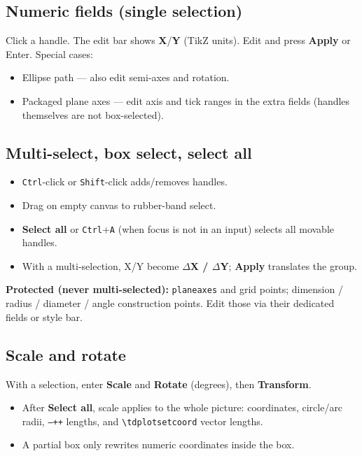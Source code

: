 \documentclass[a4paper]{ltxdoc}
\newcommand{\ui}[1]{\textbf{#1}}
\newcommand{\key}[1]{\texttt{#1}}
\begin{document}
\subsection{Numeric fields (single selection)}
Click a handle.  The edit bar shows \ui{X}/\ui{Y} (TikZ units).  Edit and
press \ui{Apply} or Enter.  Special cases:
\begin{itemize}[nosep]
  \item Ellipse path --- also edit semi-axes and rotation.
  \item Packaged plane axes --- edit axis and tick ranges in the extra
        fields (handles themselves are not box-selected).
\end{itemize}

\subsection{Multi-select, box select, select all}
\begin{itemize}[nosep]
  \item \key{Ctrl}-click or \key{Shift}-click adds/removes handles.
  \item Drag on empty canvas to rubber-band select.
  \item \ui{Select all} or \key{Ctrl}+\key{A} (when focus is not in an
        input) selects all movable handles.
  \item With a multi-selection, X/Y become \textbf{$\Delta$X / $\Delta$Y};
        \ui{Apply} translates the group.
\end{itemize}

\noindent\textbf{Protected (never multi-selected):}
\texttt{planeaxes} and grid points; dimension / radius / diameter /
angle construction points.  Edit those via their dedicated fields or
style bar.

\subsection{Scale and rotate}
With a selection, enter \ui{Scale} and \ui{Rotate} (degrees), then
\ui{Transform}.
\begin{itemize}[nosep]
  \item After \ui{Select all}, scale applies to the whole picture:
        coordinates, circle/arc radii, \texttt{--++} lengths, and
        \texttt{\textbackslash tdplotsetcoord} vector lengths.
  \item A partial box only rewrites numeric coordinates inside the box.
\end{itemize}
\end{document}
